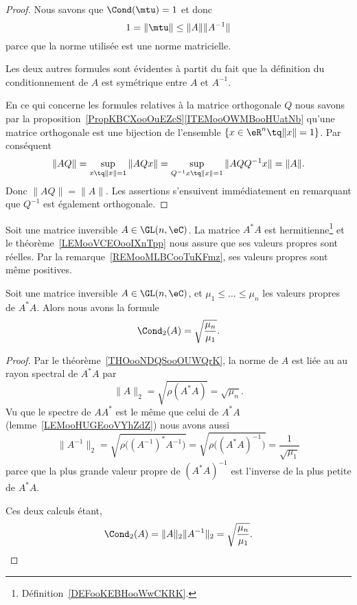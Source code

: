 \begin{proof}
    Nous savons que \( \Cond(\mtu)=1\) et donc
    \begin{equation}
        1=\| \mtu \|\leq \| A \|\| A^{-1} \|
    \end{equation}
    parce que la norme utilisée est une norme matricielle.

    Les deux autres formules sont évidentes à partit du fait que la définition du conditionnement de \( A\) est symétrique entre \( A\) et \( A^{-1}\).

    En ce qui concerne les formules relatives à la matrice orthogonale \( Q\) nous savons par la proposition~\ref{PropKBCXooOuEZcS}\ref{ITEMooOWMBooHUatNb} qu'une matrice orthogonale est une bijection de l'ensemble \(  \{ x\in \eR^n\tq \| x \|=1 \}  \). Par conséquent
    \begin{equation}
        \| AQ \|=\sup_{x\tq \| x \|=1}\| AQx \|=\sup_{ Q^{-1}x\tq \| x \|=1  }\| AQQ^{-1}x \|=\| A \|.
    \end{equation}
    Donc \( \| AQ \|=\| A \|\). Les assertions s'ensuivent immédiatement en remarquant que \( Q^{-1}\) est également orthogonale.
\end{proof}

Soit une matrice inversible \( A\in \GL(n,\eC)\). La matrice \( A^*A\) est hermitienne\footnote{Définition~\ref{DEFooKEBHooWwCKRK}.} et le théorème~\ref{LEMooVCEOooIXnTpp} nous assure que ses valeurs propres sont réelles. Par la remarque~\ref{REMooMLBCooTuKFmz}, ses valeurs propres sont même positives.

\begin{proposition}      \label{PROPooNUAUooIbVgcN}
    Soit une matrice inversible \( A\in\GL(n,\eC)\), et \( \mu_1\leq\ldots\leq \mu_n\) les valeurs propres de \( A^*A\). Alors nous avons la formule
    \begin{equation}
        \Cond_2(A)=\sqrt{ \frac{ \mu_n }{ \mu_1 }}.
    \end{equation}
\end{proposition}

\begin{proof}
    Par le théorème~\ref{THOooNDQSooOUWQrK}, la norme de \( A\) est liée au au rayon spectral de \( A^*A\) par
    \begin{equation}
        \| A \|_2=\sqrt{ \rho(A^*A) }=\sqrt{ \mu_n }.
    \end{equation}
    Vu que le spectre de \( AA^*\) est le même que celui de \( A^*A\) (lemme~\ref{LEMooHUGEooVYhZdZ}) nous avons aussi
    \begin{equation}
        \| A^{-1} \|_2=\sqrt{ \rho\big( (A^{-1})^*A^{-1} \big) }=\sqrt{ \rho\big( (A^*A)^{-1} \big) }=\frac{1}{ \sqrt{ \mu_1 } }
    \end{equation}
    parce que la plus grande valeur propre de \( (A^*A)^{-1}\) est l'inverse de la plus petite de \( A^*A\).

    Ces deux calculs étant,
    \begin{equation}
        \Cond_2(A)=\| A \|_2\| A^{-1} \|_2=\sqrt{ \frac{ \mu_n }{ \mu_1 } }.
    \end{equation}
\end{proof}

